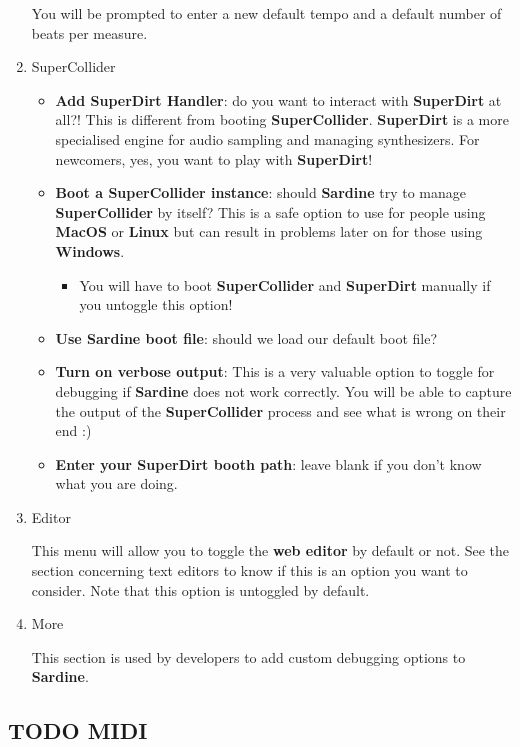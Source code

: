 \documentclass[11pt]{article}
\begin{document}
\begin{enumerate}
You will be prompted to enter a new default tempo and a default number of beats per measure.

\item SuperCollider
\label{sec:org9d8d9fc}

\begin{itemize}
\item \textbf{Add SuperDirt Handler}: do you want to interact with \textbf{SuperDirt} at all?! This is different from booting \textbf{SuperCollider}. \textbf{SuperDirt} is a more specialised engine for audio sampling and managing synthesizers. For newcomers, yes, you want to play with \textbf{SuperDirt}!
\item \textbf{Boot a SuperCollider instance}: should \textbf{Sardine} try to manage \textbf{SuperCollider} by itself? This is a safe option to use for people using \textbf{MacOS} or \textbf{Linux} but can result in problems later on for those using \textbf{Windows}.
\begin{itemize}
\item You will have to boot \textbf{SuperCollider} and \textbf{SuperDirt} manually if you untoggle this option!
\end{itemize}
\item \textbf{Use Sardine boot file}: should we load our default boot file?
\item \textbf{Turn on verbose output}: This is a very valuable option to toggle for debugging if \textbf{Sardine} does not work correctly. You will be able to capture the output of the \textbf{SuperCollider} process and see what is wrong on their end :)
\item \textbf{Enter your SuperDirt booth path}: leave blank if you don't know what you are doing.
\end{itemize}

\item Editor
\label{sec:orgb698072}

This menu will allow you to toggle the \textbf{web editor} by default or not. See the section concerning text editors to know if this is an option you want to consider. Note that this option is untoggled by default.

\item More
\label{sec:org521bf3a}

This section is used by developers to add custom debugging options to \textbf{Sardine}.
\end{enumerate}

\subsection{{\bfseries\sffamily TODO} MIDI}
\label{sec:org30dd2a8}
\end{document}

